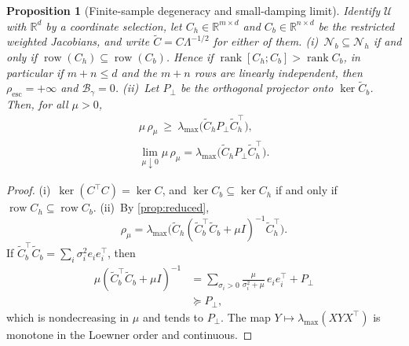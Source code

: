\documentclass[11pt]{article}
\newtheorem{proposition}{Proposition}
\newcommand{\R}{\mathbb{R}}
\newcommand{\Resc}{\rho_{\mathrm{esc}}}
\newcommand{\Barrier}{\mathcal{B}}
\newcommand{\U}{\mathcal{U}}
\newcommand{\rhoreg}{\rho_{\mu}}
\newcommand{\Ch}{C_{h}}
\newcommand{\Cb}{C_{b}}
\newcommand{\Nb}{\mathcal{N}_{b}}
\newcommand{\Nh}{\mathcal{N}_{h}}
\newcommand{\row}{\operatorname{row}}
\begin{document}
\begin{proposition}[Finite-sample degeneracy and small-damping limit]
\label{prop:degenerate}
Identify $\U$ with $\R^d$ by a coordinate selection, let $\Ch\in\R^{m\times d}$ and $\Cb\in\R^{n\times d}$ be the restricted weighted Jacobians, and write $\widetilde C=C\Lambda^{-1/2}$ for either of them.
(i)~$\Nb\subseteq\Nh$ if and only if $\row(\Ch)\subseteq\row(\Cb)$. Hence if $\operatorname{rank}[\Ch;\Cb]>\operatorname{rank}\Cb$, in particular if $m+n\le d$ and the $m+n$ rows are linearly independent, then $\Resc=+\infty$ and $\Barrier_\gamma=0$.
(ii)~Let $P_\perp$ be the orthogonal projector onto $\ker\widetilde C_b$. Then, for all $\mu>0$,
\begin{equation}
\begin{gathered}
\mu\,\rhoreg\ \ge\ \lambda_{\max}\bigl(\widetilde C_hP_\perp\widetilde C_h^\top\bigr),\\
\lim_{\mu\downarrow0}\mu\,\rhoreg=\lambda_{\max}\bigl(\widetilde C_hP_\perp\widetilde C_h^\top\bigr).
\end{gathered}
\label{eq:app_smallmu}
\end{equation}
\end{proposition}
\begin{proof}
(i)~$\ker(C^\top C)=\ker C$, and $\ker\Cb\subseteq\ker\Ch$ if and only if $\row\Ch\subseteq\row\Cb$.
(ii)~By \cref{prop:reduced},
\begin{equation*}
\rhoreg=\lambda_{\max}\bigl(\widetilde C_h(\widetilde C_b^\top\widetilde C_b+\mu I)^{-1}\widetilde C_h^\top\bigr).
\end{equation*}
If $\widetilde C_b^\top\widetilde C_b=\sum_i\sigma_i^2e_ie_i^\top$, then
\begin{equation*}
\begin{aligned}
\mu(\widetilde C_b^\top\widetilde C_b+\mu I)^{-1}&=\sum_{\sigma_i>0}\frac{\mu}{\sigma_i^2+\mu}\,e_ie_i^\top+P_\perp\\
&\succeq P_\perp ,
\end{aligned}
\end{equation*}
which is nondecreasing in $\mu$ and tends to $P_\perp$. The map $Y\mapsto\lambda_{\max}(XYX^\top)$ is monotone in the Loewner order and continuous.
\end{proof}
\end{document}
